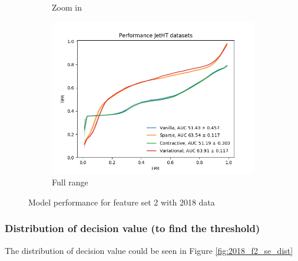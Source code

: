 \begin{figure}[h!]
\begin{subfigure}[b]{0.49\linewidth}
        \caption{Zoom in}
    \end{subfigure}
    \begin{subfigure}[b]{0.49\linewidth}
        \includegraphics[width=\linewidth]{images/reco/2018/feature_2/performance_JetHT_VanillaSparseContractiveVariational.png}
        \caption{Full range}
    \end{subfigure}
    \caption{Model performance for feature set 2 with 2018 data}
\label{fig:2018_f2_ae_performance}
\end{figure}

\subsubsection{Distribution of decision value (to find the threshold)}
The distribution of decision value could be seen in Figure \ref{fig:2018_f2_se_dist}

